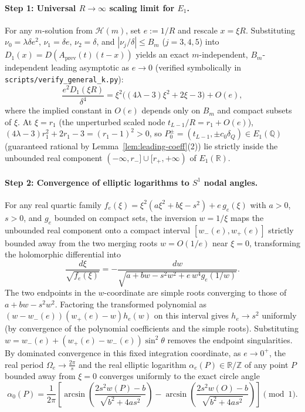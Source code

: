 \documentclass[11pt,a4paper]{article}
\theoremstyle{definition}
\theoremstyle{remark}
\newcommand{\QQ}{\mathbb{Q}}
\newcommand{\RR}{\mathbb{R}}
\newcommand{\ZZ}{\mathbb{Z}}
\begin{document}
\paragraph{Step 1: Universal $R \to \infty$ scaling limit for $E_1$.}
For any $m$-solution from $\mathcal{H}(m)$, set $e := 1/R$ and rescale $x = \xi R$. Substituting $\nu_0 = \lambda \delta e^2$, $\nu_1 = \delta e$, $\nu_2 = \delta$, and $|\nu_j / \delta| \le B_m$ ($j = 3, 4, 5$) into $D_1(x) = D(A_{\mathrm{prev}}(t)(t - x))$ yields an exact $m$-independent, $B_m$-independent leading asymptotic as $e \to 0$ (verified symbolically in \texttt{scripts/verify\_general\_k.py}):
\begin{equation}
\label{eq:U1}
\frac{e^2 D_1(\xi R)}{\delta^4} = \xi^2 \Big((4\lambda - 3)\xi^2 + 2\xi - 3\Big) + O(e),
\end{equation}
where the implied constant in $O(e)$ depends only on $B_m$ and compact subsets of $\xi$. At $\xi = r_1$ (the unperturbed scaled node $t_{L-1}/R = r_1 + O(e)$), $(4\lambda - 3)r_1^2 + 2 r_1 - 3 = (r_1 - 1)^2 > 0$, so $P_0^\pm = (t_{L-1}, \pm c_0 \delta_Q) \in E_1(\QQ)$ (guaranteed rational by Lemma~\ref{lem:leading-coeff}(2)) lie strictly inside the unbounded real component $(-\infty, r_-] \cup [r_+, +\infty)$ of $E_1(\RR)$.

\paragraph{Step 2: Convergence of elliptic logarithms to $S^1$ nodal angles.}
For any real quartic family $f_e(\xi) = \xi^2(a \xi^2 + b \xi - s^2) + e\, g_e(\xi)$ with $a > 0$, $s > 0$, and $g_e$ bounded on compact sets, the inversion $w = 1/\xi$ maps the unbounded real component onto a compact interval $[w_-(e), w_+(e)]$ strictly bounded away from the two merging roots $w = O(1/e)$ near $\xi = 0$, transforming the holomorphic differential into
\[
\frac{d\xi}{\sqrt{f_e(\xi)}} = -\frac{dw}{\sqrt{a + b w - s^2 w^2 + e\, w^4 g_e(1/w)}}.
\]
The two endpoints in the $w$-coordinate are simple roots converging to those of $a+bw-s^2w^2$. Factoring the transformed polynomial as $(w-w_-(e))(w_+(e)-w)h_e(w)$ on this interval gives $h_e\to s^2$ uniformly (by convergence of the polynomial coefficients and the simple roots). Substituting $w=w_-(e)+(w_+(e)-w_-(e))\sin^2\theta$ removes the endpoint singularities. By dominated convergence in this fixed integration coordinate, as $e \to 0^+$, the real period $\Omega_e \to \frac{2\pi}{s}$ and the real elliptic logarithm $\alpha_e(P) \in \RR/\ZZ$ of any point $P$ bounded away from $\xi = 0$ converges uniformly to the exact circle angle
\begin{equation}
\label{eq:circle-angle}
\alpha_0(P) = \frac{1}{2\pi}\left[\arcsin\!\left(\frac{2 s^2 w(P) - b}{\sqrt{b^2 + 4 a s^2}}\right) - \arcsin\!\left(\frac{2 s^2 w(O) - b}{\sqrt{b^2 + 4 a s^2}}\right)\right] \pmod{1}.
\end{equation}
\end{document}
